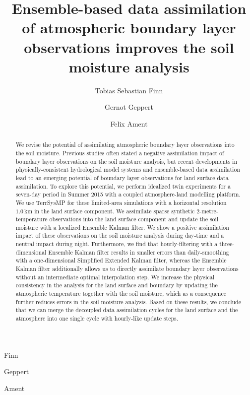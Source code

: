 \documentclass[HESSD, manuscript]{copernicus}
\begin{document}
\title{
	Ensemble-based data assimilation of atmospheric boundary layer observations improves the soil moisture analysis
}
\author[1,2,3]{Tobias Sebastian Finn}{Finn}
\author[4]{Gernot Geppert}{Geppert}
\author[1,5]{Felix Ament}{Ament}






%
%
%

\maketitle

\begin{abstract}
	We revise the potential of assimilating atmospheric boundary layer observations into the soil moisture.
	Previous studies often stated a negative assimilation impact of boundary layer observations on the soil moisture analysis, but recent developments in physically-consistent hydrological model systems and ensemble-based data assimilation lead to an emerging potential of boundary layer observations for land surface data assimilation.
	To explore this potential, we perform idealized twin experiments for a seven-day period in Summer 2015 with a coupled atmosphere-land modelling platform.
	We use TerrSysMP for these limited-area simulations with a horizontal resolution $1.0\,\text{km}$ in the land surface component.
	We assimilate sparse synthetic 2-metre-temperature observations into the land surface component and update the soil moisture with a localized Ensemble Kalman filter.
	We show a positive assimilation impact of these observations on the soil moisture analysis during day-time and a neutral impact during night.
	Furthermore, we find that hourly-filtering with a three-dimensional Ensemble Kalman filter results in smaller errors than daily-smoothing with a one-dimensional Simplified Extended Kalman filter, whereas the Ensemble Kalman filter additionally allows us to directly assimilate boundary layer observations without an intermediate optimal interpolation step.
	We increase the physical consistency in the analysis for the land surface and boundary by updating the atmospheric temperature together with the soil moisture, which as a consequence further reduces errors in the soil moisture analysis.
	Based on these results, we conclude that we can merge the decoupled data assimilation cycles for the land surface and the atmosphere into one single cycle with hourly-like update steps.
\end{abstract}
\end{document}
